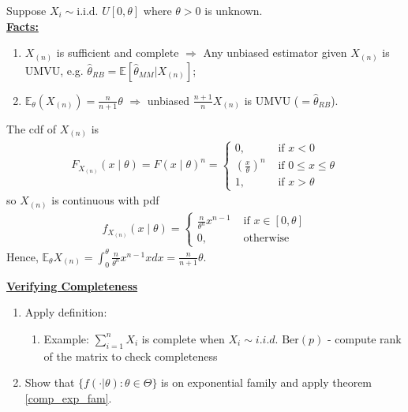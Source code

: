 \documentclass[11pt]{elegantbook}
\begin{document}
\begin{example}
    Suppose $X_i\sim \text{i.i.d. } U[0,\theta]$ where $\theta>0$ is unknown.\\
    \textbf{\underline{Facts:}}
    \begin{enumerate}[$\bullet$]
        \item $X_{(n)}$ is sufficient and complete $\Rightarrow$
        Any unbiased estimator given $X_{(n)}$ is UMVU, e.g. $\hat{\theta}_{RB}=\mathbb{E}[\hat{\theta}_{MM}|X_{(n)}]$;
        \item $\mathbb{E}_\theta(X_{(n)})=\frac{n}{n+1}\theta$ $\Rightarrow$ unbiased $\frac{n+1}{n}X_{(n)}$ is UMVU ($=\hat{\theta}_{RB}$).
    \end{enumerate}
    \begin{remark}
        The cdf of $X_{(n)}$ is
        \begin{equation}
            \begin{aligned}
                F_{X_{(n)}}(x\mid\theta)=F(x\mid\theta)^n=\left\{\begin{matrix}
                    0,&\text{ if }x<0\\
                    \left(\frac{x}{\theta}\right)^n&\text{ if }0\leq x\leq \theta\\
                    1,&\text{ if }x>\theta
                \end{matrix}\right.
            \end{aligned}
            \nonumber
        \end{equation}
        so $X_{(n)}$ is continuous with pdf
        \begin{equation}
            \begin{aligned}
                f_{X_{(n)}}(x\mid\theta)=\left\{\begin{matrix}
                    \frac{n}{\theta^n}x^{n-1}&\text{ if }x\in[0,\theta]\\
                    0,& \text{ otherwise}
                \end{matrix}\right.
            \end{aligned}
            \nonumber
        \end{equation}
        Hence, $\mathbb{E}_\theta X_{(n)}=\int_0^\theta \frac{n}{\theta^n}x^{n-1} x dx = \frac{n}{n+1}\theta$.
    \end{remark}
\end{example}

\textbf{\underline{Verifying Completeness}}
\begin{enumerate}[$\bullet$]
    \item Apply definition:
    \begin{enumerate}[$\circ$]
        \item Example: $\sum_{i=1}^n X_i$ is complete when $X_i\sim i.i.d. \text{ Ber}(p)$ - compute rank of the matrix to check completeness
    \end{enumerate}
    \item Show that $\{f(\cdot|\theta):\theta\in\Theta\}$ is on exponential family and apply theorem \ref{comp_exp_fam}.
\end{enumerate}
\end{document}
